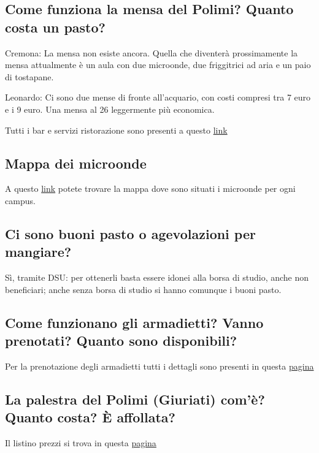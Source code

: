 \documentclass[legal]{polinetwork}
\begin{document}
\subsection{Come funziona la mensa del Polimi? Quanto costa un pasto?}


Cremona: La mensa non esiste ancora. Quella che diventerà prossimamente la mensa attualmente è un aula con due microonde, due friggitrici ad aria e un paio di tostapane.


Leonardo: Ci sono due mense di fronte all'acquario, con costi compresi tra 7 euro e i 9 euro. Una mensa al 26 leggermente più economica.

Tutti i bar e servizi ristorazione sono presenti a questo \href{https://www.polimi.it/campus-e-servizi/mense-e-bar}{link}


\subsection{Mappa dei microonde}


A questo \href{https://www.polimi.it/campus-e-servizi/mense-e-bar}{link} potete trovare la mappa dove sono situati i microonde per ogni campus.

\subsection{Ci sono buoni pasto o agevolazioni per mangiare?}


Sì, tramite DSU: per ottenerli basta essere idonei alla borsa di studio, anche non beneficiari; anche senza borsa di studio si hanno comunque i buoni pasto.

\subsection{Come funzionano gli armadietti? Vanno prenotati? Quanto sono disponibili?}


Per la prenotazione degli armadietti tutti i dettagli sono presenti in questa \href{https://www.polimi.it/campus-e-servizi/assegnazione-armadietti}{pagina}

\subsection{La palestra del Polimi (Giuriati) com'è? Quanto costa? È affollata?}


Il listino prezzi si trova in questa \href{https://www.sport.polimi.it/iscriviti-e-prenota/studenti-polimi}{pagina}
\end{document}
